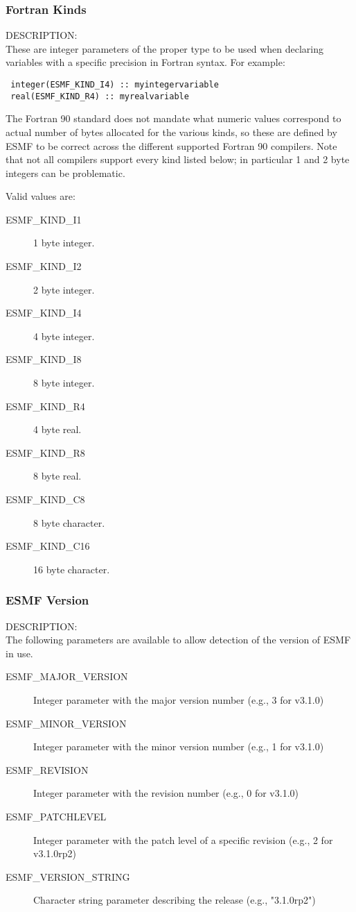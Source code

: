 \subsubsection{Fortran Kinds}

{\sf DESCRIPTION:\\}
These are integer parameters of the proper type to be
used when declaring variables with a specific precision 
in Fortran syntax.  For example:
\begin{verbatim}
 integer(ESMF_KIND_I4) :: myintegervariable
 real(ESMF_KIND_R4) :: myrealvariable
\end{verbatim}
The Fortran 90 standard does not mandate what numeric values
correspond to actual number of bytes allocated for the
various kinds, so these are defined by ESMF to be correct across
the different supported Fortran 90 compilers.   Note that not
all compilers support every kind listed below; in particular
1 and 2 byte integers can be problematic.

Valid values are:
\begin{description}
\item [ESMF\_KIND\_I1]
      1 byte integer.
\item [ESMF\_KIND\_I2]
      2 byte integer.
\item [ESMF\_KIND\_I4]
      4 byte integer.
\item [ESMF\_KIND\_I8]
      8 byte integer.
\item [ESMF\_KIND\_R4]
      4 byte real.
\item [ESMF\_KIND\_R8]
      8 byte real.
\item [ESMF\_KIND\_C8]
      8 byte character.
\item [ESMF\_KIND\_C16]
      16 byte character.
\end{description}

\subsubsection{ESMF Version}

{\sf DESCRIPTION:\\}
The following parameters are available to allow detection of the
version of ESMF in use.
\begin{description}
\item [ESMF\_MAJOR\_VERSION]
      Integer parameter with the major version number (e.g., 3 for v3.1.0)
\item [ESMF\_MINOR\_VERSION]
      Integer parameter with the minor version number (e.g., 1 for v3.1.0)
\item [ESMF\_REVISION]
      Integer parameter with the revision number (e.g., 0 for v3.1.0)
\item [ESMF\_PATCHLEVEL]
      Integer parameter with the patch level of a specific revision (e.g., 2 for v3.1.0rp2)
\item [ESMF\_VERSION\_STRING]
      Character string parameter describing the release (e.g., "3.1.0rp2")
\end{description}



